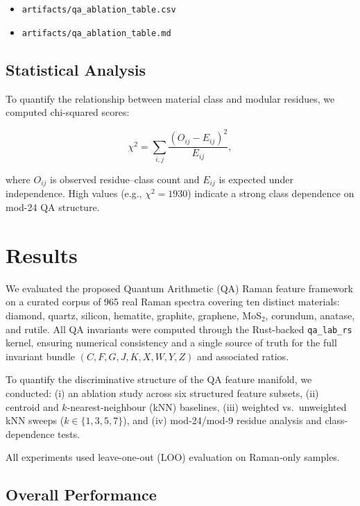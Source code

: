 \documentclass[12pt]{article}
\begin{document}
\begin{itemize}
    \item \texttt{artifacts/qa\_ablation\_table.csv}
    \item \texttt{artifacts/qa\_ablation\_table.md}
\end{itemize}

\subsection{Statistical Analysis}

To quantify the relationship between material class and modular residues, we computed chi-squared scores:

\[
\chi^2 = \sum_{i,j}
\frac{\left( O_{ij} - E_{ij} \right)^2}{E_{ij}},
\]

where $O_{ij}$ is observed residue–class count and $E_{ij}$ is expected under independence.  
High values (e.g., $\chi^2 = 1930$) indicate a strong class dependence on mod-24 QA structure.

\section{Results}
\label{sec:results}

We evaluated the proposed Quantum Arithmetic (QA) Raman feature framework on a curated corpus of 
965 real Raman spectra covering ten distinct materials:
diamond, quartz, silicon, hematite, graphite, graphene, MoS$_2$, corundum, anatase, and rutile.
All QA invariants were computed through the Rust-backed \texttt{qa\_lab\_rs} kernel, ensuring
numerical consistency and a single source of truth for the full invariant bundle
$(C, F, G, J, K, X, W, Y, Z)$ and associated ratios.

To quantify the discriminative structure of the QA feature manifold, we conducted:
(i) an ablation study across six structured feature subsets,
(ii) centroid and $k$-nearest-neighbour (kNN) baselines,
(iii) weighted vs.\ unweighted kNN sweeps ($k\in\{1,3,5,7\}$),
and (iv) mod-24/mod-9 residue analysis and class-dependence tests.

All experiments used leave-one-out (LOO) evaluation on Raman-only samples.

\subsection{Overall Performance}
\end{document}

